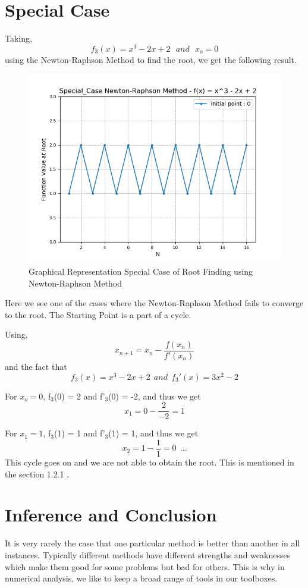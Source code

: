 \documentclass[11pt]{article}
\begin{document}
\section{Special Case}
Taking, \[f_3(x) = x^3 - 2x + 2~~~and~~~x_o = 0\]
using the Newton-Raphson Method to find the root, we get the following result.

\begin{figure}[h!]
	\centering
	\centering
	\includegraphics[width=\linewidth]{special_case_newton-raphson}
	\caption{Graphical Representation Special Case of Root Finding using Newton-Raphson Method}
	\label{fig4}
\end{figure}

Here we see one of the cases where the Newton-Raphson Method fails to converge to the root. The Starting Point is a part of a cycle.

Using,\[x_{n+1} = x_n -\frac{f(x_n)}{f'(x_n)}\] and the fact that \[f_3(x) = x^3 - 2x + 2 ~~ and ~~ f_3'(x) = 3x^2 - 2\]

For $x_o = 0$, f$_3$(0) = 2 and f'$_3$(0) = -2, and thus we get \[x_1 = 0 - \frac{2}{-2} = 1\]

For $x_1 = 1$, f$_3$(1) = 1 and f'$_3$(1) = 1, and thus we get \[x_2 = 1 - \frac{1}{1} = 0~~...\]
This cycle goes on and we are not able to obtain the root. This is mentioned in the section 1.2.1 .


\section{Inference and Conclusion}
It is very rarely the case that one particular method is better than another in all instances. Typically different methods have different strengths and weaknesses which make them good for some problems but bad for others. This is why in numerical analysis, we like to keep a broad range of tools in our toolboxes.\\
\end{document}
